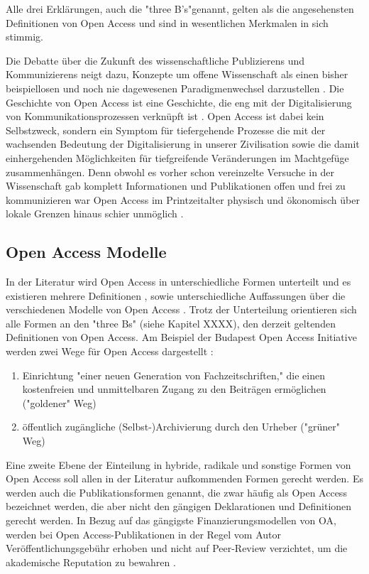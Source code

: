 Alle drei Erklärungen, auch die "three B's"\cite{suber_2004_praising_oa}genannt, gelten als die angesehensten Definitionen von Open Access und sind in wesentlichen Merkmalen in sich stimmig\cite{albert_2006_open_implications}.

Die Debatte über die Zukunft des wissenschaftliche Publizierens und Kommunizierens neigt dazu, Konzepte um offene Wissenschaft als einen bisher beispiellosen und noch nie dagewesenen Paradigmenwechsel darzustellen \cite{cite:17a} \cite{cite:17b}. Die Geschichte von Open Access ist eine Geschichte, die eng mit der Digitalisierung von Kommunikationsprozessen verknüpft ist \cite{albert_2006_open_implications}. Open Access ist dabei kein Selbstzweck\cite{cite:17d}, sondern ein Symptom für tiefergehende Prozesse die mit der wachsenden Bedeutung der Digitalisierung in unserer Zivilisation sowie die damit einhergehenden Möglichkeiten für tiefgreifende Veränderungen im Machtgefüge zusammenhängen\cite{cite:17e}. Denn obwohl es vorher schon vereinzelte Versuche in der Wissenschaft gab komplett Informationen und Publikationen offen und frei zu kommunizieren war Open Access im Printzeitalter physisch und ökonomisch über lokale Grenzen hinaus schier unmöglich \cite{cite:18a}. 

\subsection{Open Access Modelle}

In der Literatur wird Open Access in unterschiedliche Formen unterteilt und es existieren mehrere Definitionen \cite{CREATe_2014} \cite{albert_2006_open_implications}, sowie unterschiedliche Auffassungen über die verschiedenen Modelle von Open Access \cite{CREATe_2014} \cite{cite:22b} \cite{lewis_2012_inevitability}. Trotz der Unterteilung orientieren sich alle Formen an den "three Bs" (siehe Kapitel XXXX), den derzeit geltenden Definitionen von Open Access. Am Beispiel der Budapest Open Access Initiative werden zwei Wege für Open Access dargestellt \cite{albert_2006_open_implications}: 
\begin{enumerate}
\item Einrichtung "einer neuen Generation von Fachzeitschriften," die einen kostenfreien und unmittelbaren Zugang zu den Beiträgen ermöglichen ("goldener" Weg)
\item öffentlich zugängliche (Selbst-)Archivierung durch den Urheber ("grüner" Weg)
\end{enumerate}

Eine zweite Ebene der Einteilung in hybride, radikale und sonstige Formen von Open Access soll allen in der Literatur aufkommenden Formen gerecht werden. Es werden auch die Publikationsformen genannt, die zwar häufig als Open Access bezeichnet werden, die aber nicht den gängigen Deklarationen \cite{boai_2012} und Definitionen gerecht werden. In Bezug auf das gängigste Finanzierungsmodellen von OA, werden bei Open Access-Publikationen in der Regel vom Autor Veröffentlichungsgebühr erhoben und nicht auf Peer-Review verzichtet, um die akademische Reputation zu bewahren \cite{albert_2006_open_implications} \cite{Open_Access_net_2009}.

